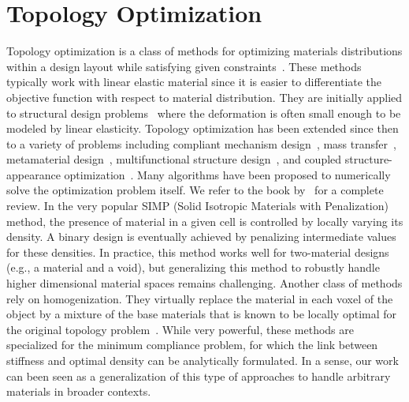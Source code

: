 \section{Topology Optimization}
Topology optimization is a class of methods for optimizing materials distributions
within a design layout while satisfying given constraints~\citep{bendsoe2004topology}.
These methods typically work with linear elastic material since it is easier to differentiate the objective function with respect to material distribution.
They are initially applied to structural design problems~\citep{bendsoe:1989:optimal} where the deformation is often small enough to be modeled by linear elasticity.
Topology optimization has been extended since then to a variety of problems including compliant mechanism design~\citep{Sigmund97Compliant},
mass transfer~\citep{challis:2009:level},
metamaterial design~\citep{Sigmund2000,cadman:2013:design},
multifunctional structure design~\citep{yan:2015:two},
and coupled structure-appearance optimization~\citep{Martinez:2015:SAO}.
Many algorithms have been proposed to numerically solve the optimization problem itself.
We refer to the book by~\citet{sigmund:2013:topology} for a complete review.
In the very popular SIMP (Solid Isotropic Materials with Penalization) method,
the presence of material in a given cell is controlled by locally varying its density.
A binary design is eventually achieved by penalizing intermediate values for these densities.
In practice, this method works well for two-material
designs (e.g., a material and a void), but generalizing this method
to robustly handle higher dimensional material spaces remains challenging.
Another class of methods rely on homogenization.
They virtually replace the material in each voxel of the object by a mixture of the base materials that is known to be locally optimal for the
original topology problem~\citep{Allaire2012}.
While very powerful, these methods are specialized for the minimum compliance problem, for
which the link between stiffness and optimal density can be analytically formulated.
In a sense, our work can been seen as a generalization of this type of approaches to handle arbitrary materials in broader contexts.

